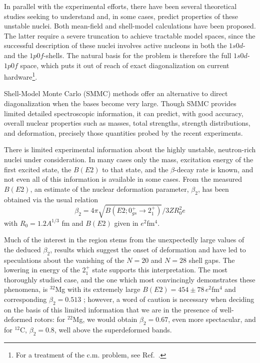 In parallel with the experimental efforts, there have been several
theoretical studies seeking to understand and, in some cases, predict
properties of these unstable nuclei.  Both mean-field
\cite{r:werner,r:campi} and shell-model calculations
\cite{r:brown1,r:brown2,r:wbmb,r:poves1,r:fukunishi,r:retamosa,r:caurier}
have been proposed. The latter require a severe truncation to
achieve tractable model spaces, since the successful description of these
nuclei involves active nucleons in both the $1s0d$- and the $1p0f$-shells.
The natural basis for the problem is therefore the full $1s0d$-$1p0f$
space, which puts it out of reach of exact diagonalization on current
hardware\footnote{For a treatment of the c.m. problem, see Ref.\ 
\cite{drhklz99}.}.

Shell-Model Monte Carlo (SMMC) methods
\cite{r:smmc_pr,r:smmc_ar,r:lang} offer an alternative to direct
diagonalization when the bases become very large. Though SMMC provides
limited detailed spectroscopic information, it can predict, with good
accuracy, overall nuclear properties such as masses, total strengths,
strength distributions, and deformation, precisely those quantities
probed by the recent experiments. 


There is limited experimental information about the highly unstable,
neutron-rich nuclei under consideration.  In many cases only the mass,
excitation energy of the first excited state, the $B(E2)$ to that state,
and the $\beta$-decay rate is known, and not even all of this
information is available in some cases.  From the
measured $B(E2)$, an estimate of the nuclear deformation parameter,
$\beta_2$, has been obtained via the usual relation
\begin{equation}
\beta_2 = 4 \pi \sqrt{B(E2; 0^+_{gs} \rightarrow 2^+_1)}/3 Z R_0^2 e
\end{equation}
with $R_0 = 1.2 A^{1/3}$ fm and $B(E2)$ given in $e^2$fm$^4$.

Much of the interest in the region stems from the unexpectedly large
values of the deduced $\beta_2$, results which suggest the onset of
deformation and have led to speculations about the vanishing of the $N
= 20$ and $N = 28$ shell gaps.  The lowering in energy of the 2$^+_1$
state supports this interpretation.  The most thoroughly studied case,
and the one which most convincingly demonstrates these phenomena, is
$^{32}$Mg with its extremely large $B(E2) = 454 \pm 78 \, e^2$fm$^4$ and
corresponding $\beta_2 = 0.513$ \cite{r:motobayashi}; however, a word of
caution is necessary when deciding on the basis of this
limited information that we are in the presence of well-deformed
rotors: for $^{22}$Mg, we would obtain $\beta_2 = 0.67$, even more
spectacular, and for $^{12}$C, $\beta_2 = 0.8$, well above the
superdeformed bands.

